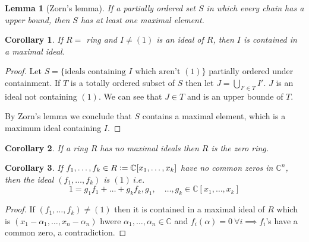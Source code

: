 \documentclass{article}
\newcommand{\C}{\mathbb{C}}
\newcommand{\ie}{\ i.e.\ }
\newcommand{\defeq}{\vcentcolon=}
\newtheorem*{corollary}{Corollary}
\newtheorem*{lemma}{Lemma}
\theoremstyle{definition}
\theoremstyle{remark}
\begin{document}
\begin{lemma}[Zorn's lemma]
    If a partially ordered set $S$ in which every chain has a upper bound, then $S$ has at least one maximal element.
\end{lemma}
\begin{corollary}
    If $R = $ ring and $I \neq (1)$ is an ideal of $R$, then $I$ is contained in a maximal ideal.
\end{corollary}
\begin{proof}
    Let $S = \{\text{ideals containing $I$ which aren't } (1)\}$ partially ordered under containment. If $T$ is a totally ordered subset of $S$ then let $J = \bigcup_{I' \in T} I'$. $J$ is an ideal not containing $(1)$. We can see that $J \in T$ and is an upper bounde of $T$.

    By Zorn's lemma we conclude that $S$ contains a maximal element, which is a maximum ideal containing $I$.
\end{proof}
\begin{corollary}
    If a ring $R$ has no maximal ideals then $R$ is the zero ring.
\end{corollary}
\begin{corollary}
    If $f_1, \ldots, f_k \in R \defeq \C[x_1, \ldots, x_k]$ have no common zeros in $\C^n$, then the ideal $(f_1, \ldots, f_k)$ is $(1) \ie$
    \[
    1 = g_1f_1 + \ldots + g_kf_k, g_1,\quad \ldots, g_k \in \C[x_1, \ldots, x_k]   
    \] 
\end{corollary}
\begin{proof}
    If $(f_1, \ldots, f_k) \neq (1)$ then it is contained in a maximal ideal of $R$ which is $(x_1 - \alpha_1, \ldots, x_n - \alpha_n)$ hwere $\alpha_1, \ldots, \alpha_n \in \C$ and $f_i(\alpha) = 0\ \forall i \implies f_i$'s have a common zero, a contradiction.
\end{proof}
\end{document}

